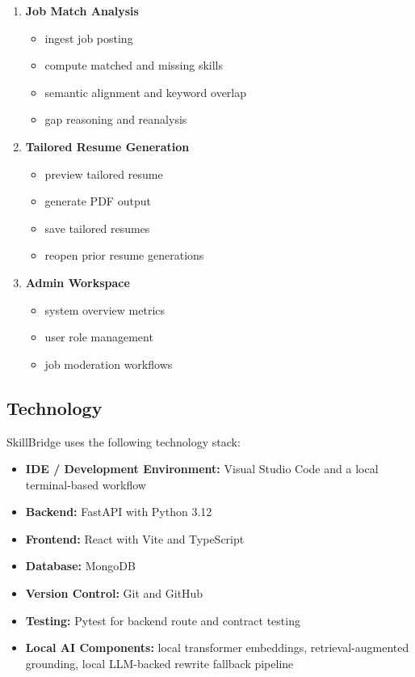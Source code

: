 \documentclass[11pt]{article}
\begin{document}
\begin{enumerate}[leftmargin=1.5em]
\begin{itemize}[leftmargin=1.25em]
  \end{itemize}
  \item \textbf{Job Match Analysis}
  \begin{itemize}[leftmargin=1.25em]
    \item ingest job posting
    \item compute matched and missing skills
    \item semantic alignment and keyword overlap
    \item gap reasoning and reanalysis
  \end{itemize}
  \item \textbf{Tailored Resume Generation}
  \begin{itemize}[leftmargin=1.25em]
    \item preview tailored resume
    \item generate PDF output
    \item save tailored resumes
    \item reopen prior resume generations
  \end{itemize}
  \item \textbf{Admin Workspace}
  \begin{itemize}[leftmargin=1.25em]
    \item system overview metrics
    \item user role management
    \item job moderation workflows
  \end{itemize}
\end{enumerate}

\subsection{Technology}
SkillBridge uses the following technology stack:
\begin{itemize}[leftmargin=1.25em]
  \item \textbf{IDE / Development Environment:} Visual Studio Code and a local terminal-based workflow
  \item \textbf{Backend:} FastAPI with Python 3.12
  \item \textbf{Frontend:} React with Vite and TypeScript
  \item \textbf{Database:} MongoDB
  \item \textbf{Version Control:} Git and GitHub
  \item \textbf{Testing:} Pytest for backend route and contract testing
  \item \textbf{Local AI Components:} local transformer embeddings, retrieval-augmented grounding, local LLM-backed rewrite fallback pipeline
\end{itemize}
\end{document}
